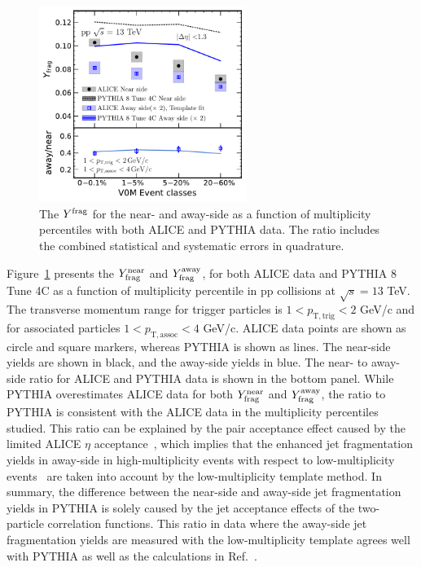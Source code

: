 \begin{figure}[h!]
	\centering
	\hspace{-3em}\includegraphics[width=0.6\textwidth]{figures/Fig5_Plot_v2Mult.pdf} 
	\caption{The $Y^{\rm{frag}}$ for the near- and away-side as a function of multiplicity percentiles with both ALICE and PYTHIA data. The ratio includes the combined statistical and systematic errors in quadrature.}
	\label{fig:Ymult}
\end{figure}

Figure~\ref{fig:Ymult} presents the $Y^{\mathrm{near}}_{\rm{frag}}$ and $Y^{\mathrm{away}}_{\rm{frag}}$, for both ALICE data and PYTHIA 8 Tune 4C as a function of multiplicity percentile in pp collisions at $\sqrt{s}=13$ TeV. The transverse momentum range for trigger particles is $1<p_\mathrm{T,trig}<2$ GeV/c and for associated particles $1<p_\mathrm{T,assoc}<4$ GeV/c. ALICE data points are shown as circle and square markers, whereas PYTHIA is shown as lines. The near-side yields are shown in black, and the away-side yields in blue.
The near- to away-side ratio for ALICE and PYTHIA data is shown in the bottom panel. While PYTHIA overestimates ALICE data for both $Y^{\mathrm{near}}_{\rm{frag}}$ and $Y^{\mathrm{away}}_{\rm{frag}}$, the ratio to PYTHIA is consistent with the ALICE data in the multiplicity percentiles studied. This ratio can be explained by the pair acceptance effect caused by the limited ALICE $\eta$ acceptance~\cite{PHENIX:2006gto}, which implies that the enhanced jet fragmentation yields in away-side in high-multiplicity events with respect to low-multiplicity events~\cite{ALICE:2013tla,ALICE:2014mas} are taken into account by the low-multiplicity template method. In summary, the difference between the near-side and away-side jet fragmentation yields in PYTHIA is solely caused by the jet acceptance effects of the two-particle correlation functions. This ratio in data where the away-side jet fragmentation yields are measured with the low-multiplicity template agrees well with PYTHIA as well as the calculations in Ref.~\cite{PHENIX:2006gto}.


